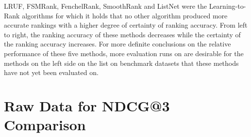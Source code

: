 \documentclass{sig-alternate-2013}
\begin{document}
LRUF, FSMRank, FenchelRank, SmoothRank and ListNet were the Learning-to-Rank algorithms for which it holds that no other algorithm produced more accurate rankings with a higher degree of certainty of ranking accuracy. From left to right, the ranking accuracy of these methods decreases while the certainty of the ranking accuracy increases. For more definite conclusions on the relative performance of these five methods, more evaluation runs on are desirable for the methods on the left side on the list on benchmark datasets that these methods have not yet been evaluated on.\\


%

%
%
\appendix
\section{Raw Data for NDCG@3 Comparison}
\label{app:norm_winnum_NDCG3}
\end{document}
